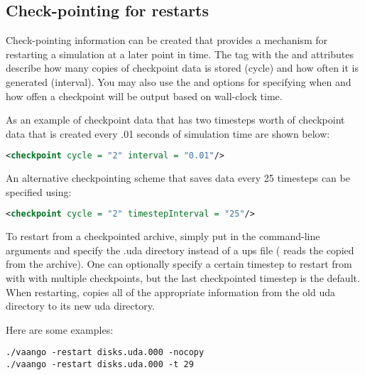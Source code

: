 \subsection{Check-pointing for restarts}
Check-pointing information can be created that provides a mechanism for
restarting a simulation at a later point in time.  The 
tag with the  and  attributes describe how many
copies of checkpoint data is stored (cycle) and how often it is generated
(interval).  You may also use the  and 
options for specifying when and how offen a checkpoint will be output based
on wall-clock time.

As an example of checkpoint data that has two timesteps worth of
checkpoint data that is created every .01 seconds of simulation time
are shown below:
\begin{lstlisting}[language=XML]
<checkpoint cycle = "2" interval = "0.01"/>
\end{lstlisting}
An alternative checkpointing scheme that saves data every 25 timesteps can
be specified using:
\begin{lstlisting}[language=XML]
<checkpoint cycle = "2" timestepInterval = "25"/>
\end{lstlisting}

To restart from a checkpointed archive, simply put  in the
 command-line arguments and specify the .uda directory instead of
a ups file ( reads the copied  from the
archive).  One can optionally specify a certain timestep to restart
from with  with multiple checkpoints, but the
last checkpointed timestep is the default.  When restarting, 
copies all of the appropriate information from the old uda directory to its
new uda directory.

Here are some examples:

\begin{lstlisting}[backgroundcolor=\color{background}]
./vaango -restart disks.uda.000 -nocopy
./vaango -restart disks.uda.000 -t 29
\end{lstlisting}
%

